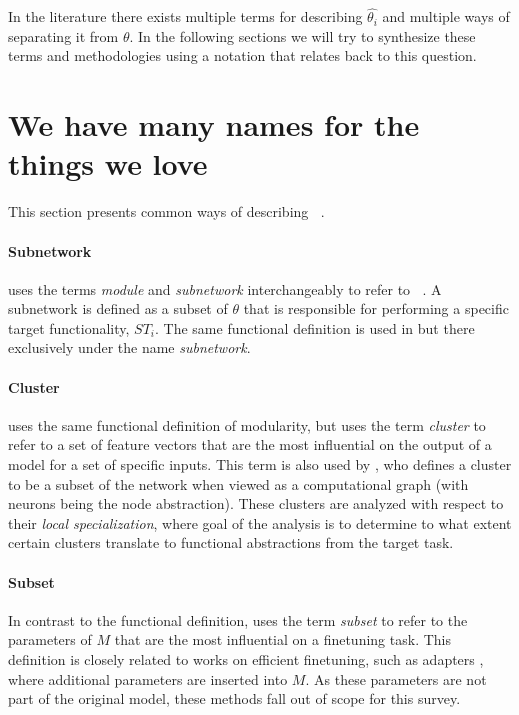 \documentclass[11pt]{article}
\DeclareMathOperator*{\subnetwork}{\hat{\theta_i}}
\begin{document}
In the literature there exists  multiple terms for describing $\hat{\theta_i}$ and multiple ways of separating it from $\theta$. In the following sections we will try to synthesize these terms and methodologies using a notation that relates back to this question.

\section{We have many names for the things we love}
This section presents common ways of describing $\subnetwork$.
\paragraph{Subnetwork}
\citet{csordas2020neural} uses the terms \textit{module} and \textit{subnetwork} interchangeably to refer to $\subnetwork$. A subnetwork is defined as a subset of $\theta$ that is responsible for performing a specific target functionality, $ST_i$. The same functional definition is used in \citet{lepori2023break} but there exclusively under the name \textit{subnetwork}. 
\paragraph{Cluster}
\citet{watanabe2019interpreting} uses the same functional definition of modularity, but uses the term \textit{cluster} to refer to a set of feature vectors that are the most influential on the output of a model for a set of specific inputs. This term is also used by \citet{casper2022graphical}, who defines a cluster to be a subset of the network when viewed as a computational graph (with neurons being the node abstraction). These clusters are analyzed with respect to their \textit{local specialization}, where goal of the analysis is to determine to what extent certain clusters translate to functional abstractions from the target task.
\paragraph{Subset}
In contrast to the functional definition, \citet{ansell-etal-2022-composable} uses the term \textit{subset} to refer to the parameters of $M$ that are the most influential on a finetuning task. This definition is closely related to works on efficient finetuning, such as adapters \citep{houlsby2019parameter}, where additional parameters are inserted into $M$. As these parameters are not part of the original model, these methods fall out of scope for this survey.
\end{document}
